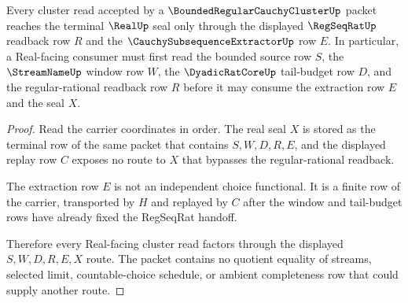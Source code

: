 \begin{theorem}
\label{thm:bounded-regular-cauchy-cluster-regseq-handoff}
Every cluster read accepted by a $\BoundedRegularCauchyClusterUp$ packet reaches the terminal $\RealUp$ seal only through the displayed $\RegSeqRatUp$ readback row $R$ and the $\CauchySubsequenceExtractorUp$ row $E$. In particular, a Real-facing consumer must first read the bounded source row $S$, the $\StreamNameUp$ window row $W$, the $\DyadicRatCoreUp$ tail-budget row $D$, and the regular-rational readback row $R$ before it may consume the extraction row $E$ and the seal $X$.
\end{theorem}
\begin{proof}
Read the carrier coordinates in order. The real seal $X$ is stored as the terminal row of the same packet that contains $S,W,D,R,E$, and the displayed replay row $C$ exposes no route to $X$ that bypasses the regular-rational readback.

The extraction row $E$ is not an independent choice functional. It is a finite row of the carrier, transported by $H$ and replayed by $C$ after the window and tail-budget rows have already fixed the RegSeqRat handoff.

Therefore every Real-facing cluster read factors through the displayed $S,W,D,R,E,X$ route. The packet contains no quotient equality of streams, selected limit, countable-choice schedule, or ambient completeness row that could supply another route.
\end{proof}


\begin{closurestatus}{\BoundedRegularCauchyClusterUp}
  \theoryclosure{\seedClosure}
  \formalstatus{\unformalizedV}
\end{closurestatus}
